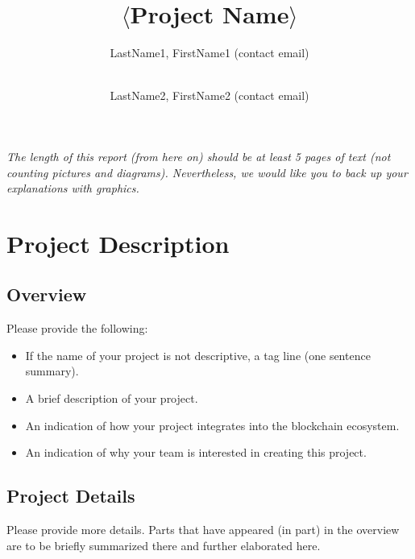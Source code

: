 \documentclass{scrarticle}
\begin{document}
	\title{$\langle$Project Name$\rangle$} %
	\author{%
		LastName1, FirstName1 (contact email) 
		\and \\
		LastName2, FirstName2 (contact email)
	}
	
	\clearpage
	
	
	\textit{The length of this report (from here on) should be at least 5 pages of text (not counting pictures and diagrams). Nevertheless, we would like you to back up your explanations with graphics.}
	
	\section{Project Description}
	
	\subsection{Overview}
	
	Please provide the following:
	\begin{itemize}
		\item If the name of your project is not descriptive, a tag line (one sentence summary).
		\item A brief description of your project.
		\item An indication of how your project integrates into the blockchain ecosystem.
		\item An indication of why your team is interested in creating this project.
	\end{itemize}	
	
	\subsection{Project Details}
	
	Please provide more details. Parts that have appeared (in part) in the overview are to be briefly summarized there and further elaborated here.
	
\end{document}
